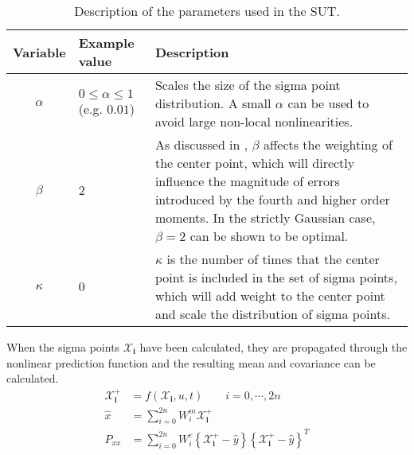     \begin{table}
        \begin{tabularx}{\tablewidth}{c|p{2cm}X}
            \textbf{Variable} & \textbf{Example value} & \textbf{Description} \\ \hline
            $\alpha$ & $0 \leq \alpha \leq 1$ (e.g. $0.01$) & Scales the size of the sigma point distribution.
                                                A small $\alpha$ can be used to avoid large non-local nonlinearities. \\
            $\beta$  & $2$ &  As discussed in \citep{Julier02thescaled}, $\beta$ affects the weighting of the center point,
                            which will directly influence the magnitude of errors introduced by the fourth and higher
                            order moments. In the strictly Gaussian case, $\beta = 2$ can be shown to be optimal. \\
            $\kappa$ & $0$ &  $\kappa$ is the number of times that the center point is included in the set of sigma points,
                            which will add weight to the center point and scale the distribution of sigma points. \\
        \end{tabularx}
        \label{tbl:observer:ukf::parameters}
        \caption{Description of the parameters used in the SUT.}
    \end{table}

    When the sigma points $\mathbf{\mathcal{X}_{i}}$ have been calculated,
    they are propagated through the nonlinear prediction function and
    the resulting mean and covariance can be calculated.
    \begin{align}
        \mathbf{\mathcal{X}^{+}_{i}} &= f(\mathbf{\mathcal{X}_{i}}, u, t) \qquad i = 0,\cdots,2n \\
        \hat{x} &= \sum_{i=0}^{2n}W^{m}_{i}\mathbf{\mathcal{X}^{+}_{i}} \\
        P_{xx} &= \sum_{i=0}^{2n}W^{c}_{i}
            \left\lbrace \mathbf{\mathcal{X}^{+}_{i}} - \hat{y} \right\rbrace
            \left\lbrace \mathbf{\mathcal{X}^{+}_{i}} - \hat{y} \right\rbrace^{T}
    \end{align}

